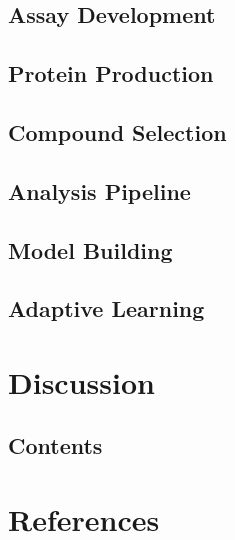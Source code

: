 \hypertarget{assay-development}{%
\subsection{Assay Development}\label{assay-development}}

\hypertarget{protein-production}{%
\subsection{Protein Production}\label{protein-production}}

\hypertarget{compound-selection}{%
\subsection{Compound Selection}\label{compound-selection}}

\hypertarget{analysis-pipeline}{%
\subsection{Analysis Pipeline}\label{analysis-pipeline}}

\hypertarget{model-building}{%
\subsection{Model Building}\label{model-building}}

\hypertarget{adaptive-learning}{%
\subsection{Adaptive Learning}\label{adaptive-learning}}

\hypertarget{discussion}{%
\section{Discussion}\label{discussion}}

\hypertarget{contents-21}{%
\subsection{Contents}\label{contents-21}}

\hypertarget{references}{%
\section{References}\label{references}}
